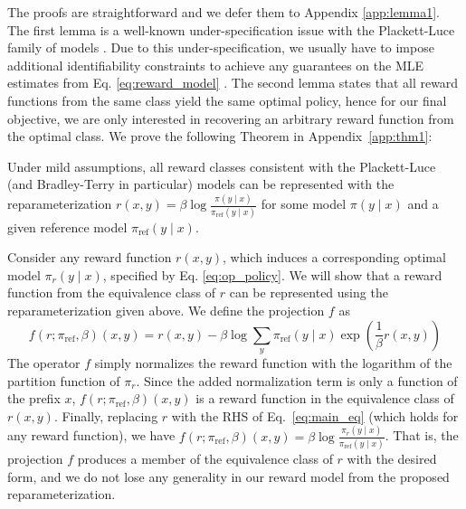 The proofs are straightforward and we defer them to Appendix \ref{app:lemma1}. The first lemma is a well-known under-specification issue with the Plackett-Luce family of models \cite{plackett1975analysis}. Due to this under-specification, we usually have to impose additional identifiability constraints to achieve any guarantees on the MLE estimates from Eq. \ref{eq:reward_model} \cite{bong2022generalized}. The second lemma states that all reward functions from the same class yield the same optimal policy, hence for our final objective, we are only interested in recovering an arbitrary reward function from the optimal class. We prove the following Theorem in Appendix~\ref{app:thm1}:

\begin{theorem}\label{thm:main}
    Under mild assumptions, all reward classes consistent with the Plackett-Luce (and Bradley-Terry in particular) models can be represented with the reparameterization ${r(x, y) = \beta \log \frac{\pi(y\mid x)}{\pi_\text{ref}(y\mid x)}}$ for some model $\pi(y\mid x)$ and a given reference model $\pi_\text{ref}(y \mid x)$.
\end{theorem}

\begin{sproof}
    Consider any reward function $r(x, y)$, which induces a corresponding optimal model $\pi_r(y \mid x)$, specified by Eq. \ref{eq:op_policy}. We will show that a reward function from the equivalence class of $r$ can be represented using the reparameterization given above. We define the projection $f$ as  
\begin{equation}
    f(r; \pi_\text{ref}, \beta)(x, y) = r(x, y) - \beta\log\sum_{y}\pi_\text{ref}(y\mid x)\exp\left(\frac{1}{\beta}r(x, y)\right)
\end{equation}
The operator $f$ simply normalizes the reward function with the logarithm of the partition function of $\pi_r$. Since the added normalization term is only a function of the prefix $x$, $f(r; \pi_\text{ref}, \beta)(x, y) $ is a reward function in the equivalence class of $r(x, y)$. Finally, replacing $r$ with the RHS of Eq.~\ref{eq:main_eq} (which holds for any reward function), we have $f(r; \pi_\text{ref}, \beta)(x, y) = \beta \log \frac{\pi_r(y\mid x)}{\pi_\text{ref}(y\mid x)}$. That is, the projection $f$ produces a member of the equivalence class of $r$ with the desired form, and we do not lose any generality in our reward model from the proposed reparameterization.
\end{sproof}

